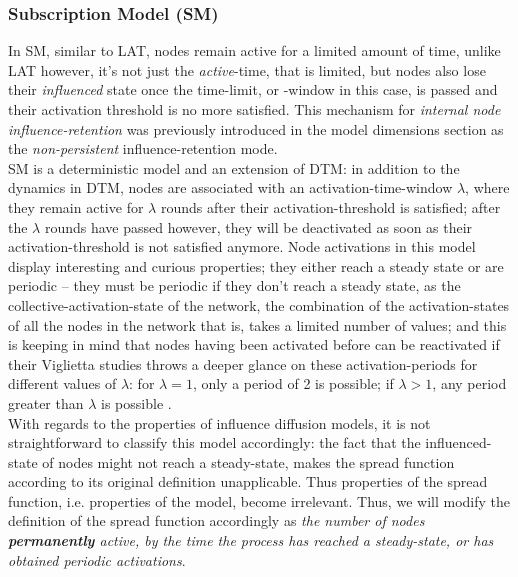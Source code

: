 \documentclass[twocolumn, 10pt]{article}
\begin{document}
\subsubsection{Subscription Model (SM)}
In SM, similar to LAT, nodes remain active for a limited amount of time, unlike LAT however, it's not just the \textit{active}-time, that is limited, but nodes also lose their \textit{influenced} state once the time-limit, or -window in this case, is passed and their activation threshold is no more satisfied. This mechanism for \textit{internal node influence-retention} was previously introduced in the model dimensions section as the \textit{non-persistent} influence-retention mode. \\
SM is a deterministic model and an extension of DTM: in addition to the dynamics in DTM, nodes are associated with an activation-time-window $\lambda$, where they remain active for $\lambda$ rounds after their activation-threshold is satisfied; after the $\lambda$ rounds have passed however, they will be deactivated as soon as their activation-threshold is not satisfied anymore.
Node activations in this model display interesting and curious properties; they either reach a steady state or are periodic -- they must be periodic if they don't reach a steady state, as the collective-activation-state of the network, the combination of the activation-states of all the nodes in the network that is, takes a limited number of values; and this is keeping in mind that nodes having been activated before can be reactivated if their Viglietta studies throws a deeper glance on these activation-periods for different values of $\lambda$: for $\lambda = 1$, only a period of 2 is possible; if $\lambda > 1$, any period greater than $\lambda$ is possible \cite{vig}. \\
With regards to the properties of influence diffusion models, it is not straightforward to classify this model accordingly: the fact that the influenced-state of nodes might not reach a steady-state, makes the spread function according to its original definition unapplicable. Thus properties of the spread function, i.e. properties of the model, become irrelevant. Thus, we will modify the definition of the spread function accordingly as \textit{the number of nodes \textbf{permanently} active, by the time the process has reached a steady-state, or has obtained periodic activations}.\\
\end{document}
